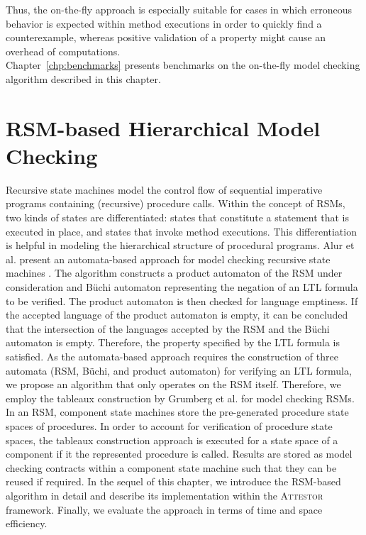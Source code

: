 \documentclass[a4paper, 12pt, twoside]{report}
\begin{document}
	Thus, the on-the-fly approach is especially suitable for cases in which erroneous behavior is expected within method executions in order to quickly find a counterexample, whereas positive validation of a property might cause an overhead of computations. \\
	
	Chapter~\ref{chp:benchmarks} presents benchmarks on the on-the-fly model checking algorithm described in this chapter.
	
	\chapter{RSM-based Hierarchical Model Checking}\label{chp:hmc}

	Recursive state machines model the control flow of sequential imperative programs containing (recursive) procedure calls. Within the concept of RSMs, two kinds of states are differentiated: states that constitute a statement that is executed in place, and states that invoke method executions. This differentiation is helpful in modeling the hierarchical structure of procedural programs. Alur et al. present an automata-based approach for model checking recursive state machines \cite{alur2001analysis}. The algorithm constructs a product automaton of the RSM under consideration and Büchi automaton representing the negation of an LTL formula to be verified. The product automaton is then checked for language emptiness. If the accepted language of the product automaton is empty, it can be concluded that the intersection of the languages accepted by the RSM and the Büchi automaton is empty. Therefore, the property specified by the LTL formula is satisfied. As the automata-based approach requires the construction of three automata (RSM, Büchi, and product automaton) for verifying an LTL formula, we propose an algorithm that only operates on the RSM itself. Therefore, we employ the tableaux construction by Grumberg et al. for model checking RSMs. In an RSM, component state machines store the pre-generated procedure state spaces of procedures. In order to account for verification of procedure state spaces, the tableaux construction approach is executed for a state space of a component if it the represented procedure is called. Results are stored as model checking contracts within a component state machine such that they can be reused if required. In the sequel of this chapter, we introduce the RSM-based algorithm in detail and describe its implementation within the \textsc{Attestor} framework. Finally, we evaluate the approach in terms of time and space efficiency.
\end{document}
